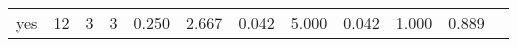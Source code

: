 \begin{longtable}{lp{1.00cm}p{1.00cm}p{1.00cm}p{1.00cm}p{1.00cm}p{1.00cm}p{1.00cm}p{1.00cm}p{1.00cm}p{1.00cm}p{1.00cm}}
yes       &                           12 &                  3 &                                 3 &                                      0.250 &                                  2.667 &                                        0.042 &                             5.000 &                                   0.042 &                        1.000 &                                        0.889 \\
\end{longtable}
